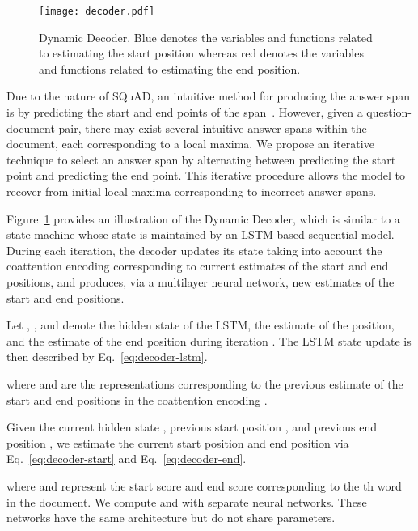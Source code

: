\documentclass{article} \usepackage{iclr2017_conference,times}
\newcommand{\squad}{SQuAD\xspace}
\begin{document}
\begin{figure}[!t]
    \centering
	\texttt{[image: decoder.pdf]}
    \vspace{-0.5cm}
	\caption{Dynamic Decoder. Blue denotes the variables and functions related to estimating the start position whereas red denotes the variables and functions related to estimating the end position.}
	\label{fig:decoder}
\end{figure}

Due to the nature of \squad, an intuitive method for producing the answer span is by predicting the start and end points of the span~\citep{wang2016machine}.
However, given a question-document pair, there may exist several intuitive answer spans within the document, each corresponding to a local maxima.
We propose an iterative technique to select an answer span by alternating between predicting the start point and predicting the end point.
This iterative procedure allows the model to recover from initial local maxima corresponding to incorrect answer spans.

Figure~\ref{fig:decoder} provides an illustration of the Dynamic Decoder, which is similar to a state machine whose state is maintained by an LSTM-based sequential model.
During each iteration, the decoder updates its state taking into account the coattention encoding corresponding to current estimates of the start and end positions, and produces, via a multilayer neural network, new estimates of the start and end positions.

Let , , and  denote the hidden state of the LSTM, the estimate of the position, and the estimate of the end position during iteration .
The LSTM state update is then described by Eq.~\ref{eq:decoder-lstm}.



where  and  are the representations corresponding to the previous estimate of the start and end positions in the coattention encoding .

Given the current hidden state , previous start position , and previous end position , we estimate the current start position and end position via Eq.~\ref{eq:decoder-start} and Eq.~\ref{eq:decoder-end}.





where  and  represent the start score and end score corresponding to the th word in the document.
We compute  and  with separate neural networks.
These networks have the same architecture but do not share parameters.
\end{document}
